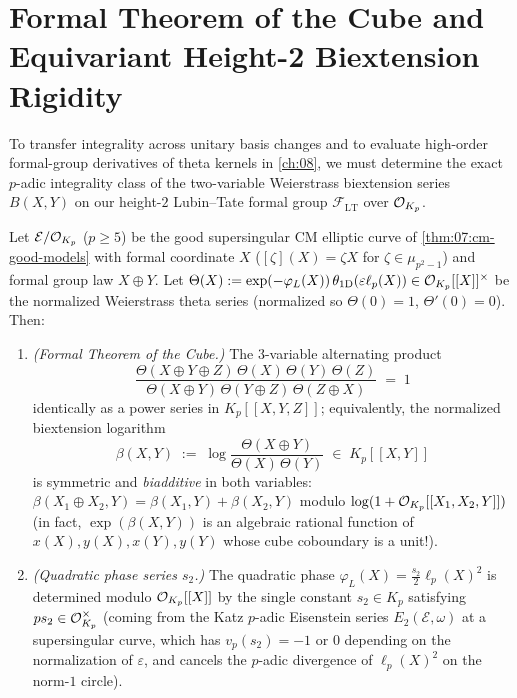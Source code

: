 \section{Formal Theorem of the Cube and Equivariant Height-2 Biextension Rigidity}
\label{sec:07:biextension}

To transfer integrality across unitary basis changes and to evaluate high-order formal-group derivatives of theta kernels in \cref{ch:08}, we must determine the exact $p$-adic integrality class of the two-variable Weierstrass biextension series $B(X, Y)$ on our height-$2$ Lubin--Tate formal group $\mathcal{F}_{\mathrm{LT}}$ over $\mathcal{O}_{K_p}$.

\begin{proposition}
\label{prop:07:cube}
Let $\mathcal{E} / \mathcal{O}_{K_p}$ ($p \ge 5$) be the good supersingular CM elliptic curve of \cref{thm:07:cm-good-models} with formal coordinate $X$ ($[\zeta](X) = \zeta X$ for $\zeta \in \mu_{p^2-1}$) and formal group law $X \oplus Y$. Let $\Theta(X) := \exp(-\varphi_L(X))\,\theta_{1\mathrm{D}}(\varepsilon\ell_p(X)) \in \mathcal{O}_{K_p}[[X]]^\times$ be the normalized Weierstrass theta series (normalized so $\Theta(0) = 1$, $\Theta'(0) = 0$). Then:
\begin{enumerate}[label=\textup{(\roman*)}]
\item \emph{(Formal Theorem of the Cube.)} The $3$-variable alternating product
  \[
    \frac{\Theta(X \oplus Y \oplus Z)\,\Theta(X)\,\Theta(Y)\,\Theta(Z)}{\Theta(X \oplus Y)\,\Theta(Y \oplus Z)\,\Theta(Z \oplus X)} \;=\; 1
  \]
  identically as a power series in $K_p[[X, Y, Z]]$; equivalently, the normalized biextension logarithm
  \begin{equation}
  \label{eq:07:biext-def}
    \beta(X, Y) \;:=\; \log\frac{\Theta(X \oplus Y)}{\Theta(X)\,\Theta(Y)} \;\in\; K_p[[X, Y]]
  \end{equation}
  is symmetric and \emph{biadditive} in both variables: $\beta(X_1 \oplus X_2, Y) = \beta(X_1, Y) + \beta(X_2, Y)$ modulo $\log(1 + \mathcal{O}_{K_p}[[X_1, X_2, Y]])$ (in fact, $\exp(\beta(X, Y))$ is an algebraic rational function of $x(X), y(X), x(Y), y(Y)$ whose cube coboundary is a unit!).
\item \emph{(Quadratic phase series $s_2$.)} The quadratic phase $\varphi_L(X) = \frac{s_2}{2}\ell_p(X)^2$ is determined modulo $\mathcal{O}_{K_p}[[X]]$ by the single constant $s_2 \in K_p$ satisfying $p s_2 \in \mathcal{O}_{K_p}^\times$ (coming from the Katz $p$-adic Eisenstein series $E_2(\mathcal{E}, \omega)$ at a supersingular curve, which has $v_p(s_2) = -1$ or $0$ depending on the normalization of $\varepsilon$, and cancels the $p$-adic divergence of $\ell_p(X)^2$ on the norm-$1$ circle).
\end{enumerate}
\end{proposition}

